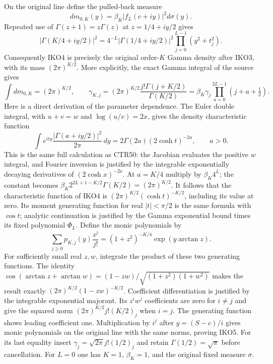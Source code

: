 \documentclass[11pt,a4paper]{article}
\begin{document}
On the original line define the pulled-back measure
\[
 dm_{0,K}(y)=\beta_K|f_L(c+iy)|^2d\sigma(y).
 \tag{IKO4}
\]
Repeated use of $\Gamma(z+1)=z\Gamma(z)$ at
$z=1/4+iy/2$ gives
\[
 |\Gamma(K/4+iy/2)|^2
     =4^{-L}|\Gamma(1/4+iy/2)|^2
                    \prod_{j=0}^{L-1}(y^2+t_j^2).
\]
Consequently IKO4 is precisely the original order-$K$ Gamma density
after IKO3, with its mass $(2\pi)^{K/2}$. More explicitly, the exact
Gamma integral of the source gives
\[
 \int dm_{0,K}=(2\pi)^{K/2},\qquad
 \gamma_{K,j}=(2\pi)^{K/2}
            \frac{j!\Gamma(j+K/2)}{\Gamma(K/2)}
      =\beta_K\gamma_j\prod_{a=0}^{2L-1}(j+a+\tfrac12).
 \tag{IKO5}
\]
Here is a direct derivation of the parameter dependence. The Euler
double integral, with $u+v=w$ and $\log(u/v)=2x$, gives the density
characteristic function
\[
 \int e^{ity}\frac{|\Gamma(a+iy/2)|^2}{2\pi}\,dy
      =2\Gamma(2a)(2\cosh t)^{-2a},\qquad a>0.
\]
This is the same full calculation as CTR50: the Jacobian evaluates
the positive $w$ integral, and Fourier inversion is justified by the
integrable exponentially decaying derivatives of $(2\cosh x)^{-2a}$.
At $a=K/4$ multiply by $\beta_K4^L$; the constant becomes
$\beta_K2^{2L+1-K/2}\Gamma(K/2)=(2\pi)^{K/2}$.
It follows that the characteristic function of IKO4 is
$(2\pi)^{K/2}(\cosh t)^{-K/2}$, including its value at zero.
Its moment generating function for real $|t|<\pi/2$ is the same
formula with $\cos t$; analytic continuation is justified by the
Gamma exponential bound times its fixed polynomial $\Phi_L$.
Define the monic polynomials by
\[
 \sum_{j\geq0}p_{K,j}(y)\frac{z^j}{j!}
       =(1+z^2)^{-K/4}\exp(y\arctan z).
\]
For sufficiently small real $z,w$, integrate the product of these
two generating functions. The identity
$\cos(\arctan z+\arctan w)=(1-zw)/
\sqrt{(1+z^2)(1+w^2)}$ makes the result exactly
$(2\pi)^{K/2}(1-zw)^{-K/2}$.
Coefficient differentiation is justified by the integrable exponential
majorant. Its $z^iw^j$ coefficients are zero for $i\ne j$ and give
the squared norm $(2\pi)^{K/2}j!(K/2)_j$ when $i=j$.
The generating function shows leading coefficient one. Multiplication
by $i^j$ after $y=(S-c)/i$ gives monic polynomials on the original
line with the same norms, proving IKO5. For its last equality insert
$\gamma_j=\sqrt{2\pi}j!(1/2)_j$ and retain
$\Gamma(1/2)=\sqrt\pi$ before cancellation.
For $L=0$ one has $K=1$,
$\beta_K=1$, and the original fixed measure $\sigma$.
\end{document}
